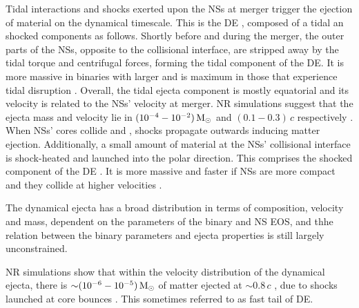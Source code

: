 Tidal interactions and shocks exerted upon the \acp{NS} at merger trigger the 
ejection of material on the dynamical timescale. This is the \ac{DE} \citep[\eg][]{Hotokezaka:2013b,Bauswein:2013yna,Radice:2016dwd,Radice:2018pdn},
composed of a tidal an shocked components as follows. 
%
Shortly before and during the merger, the outer parts 
of the \acp{NS}, opposite to the collisional interface, are stripped 
away by the tidal torque and centrifugal forces, forming the tidal 
component of the \ac{DE}. It is more massive in binaries with 
larger \mr{} and is maximum in those that experience tidal disruption 
\citep[\eg][]{Radice:2018pdn,Bernuzzi:2020txg}.
%
Overall, the tidal ejecta component is mostly equatorial and its 
velocity is related to the \acp{NS}' velocity at merger. 
%
\ac{NR} simulations suggest that the ejecta mass and velocity 
lie in $(10^{-4}-10^{-2})\,{\text{M}_{\odot}}$ and $(0.1-0.3)\,c$ respectively 
\citep{Hotokezaka:2013b,Bauswein:2013yna,Sekiguchi:2016bjd,Radice:2018pdn}.
%
When \acp{NS}' cores collide and \bnc{}, shocks propagate outwards inducing 
matter ejection. Additionally, a small amount of material at the 
\acp{NS}' collisional interface is shock-heated and launched into the polar 
direction. This comprises the shocked component of the \ac{DE} 
\citep{Bauswein:2013yna,Radice:2018pdn}.
%
It is more massive and faster if \acp{NS} are more compact and they collide 
at higher velocities \citep[\eg][]{Radice:2018pdn}. 


The dynamical ejecta has a broad distribution in terms of composition, 
velocity and mass, dependent on the parameters of the binary and \ac{NS} \ac{EOS}, 
%
and thhe relation between the binary parameters and ejecta properties is still 
largely unconstrained.

\ac{NR} simulations show that within the velocity distribution of the dynamical ejecta, 
there is ${\sim}(10^{-6}-10^{-5})\,{\text{M}_{\odot}}$ of matter ejected at ${\sim}0.8\,c$ 
\citep{Metzger:2014yda,Hotokezaka:2018gmo,Radice:2018pdn,Radice:2018ghv}, 
due to shocks launched at core bounces \citep{Radice:2018pdn}. 
This sometimes referred to as fast tail of \ac{DE}.


